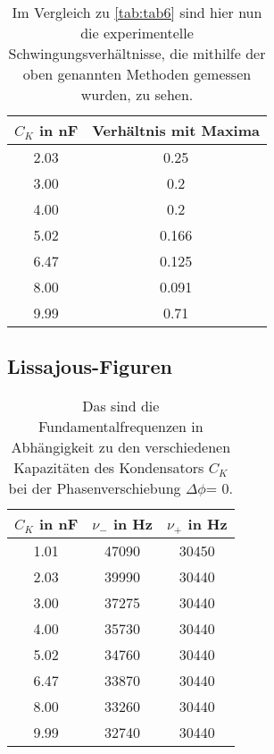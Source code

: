 \newpage

\begin{table}
  \centering
  \caption{Im Vergleich zu \autoref{tab:tab6} sind hier nun die  experimentelle Schwingungsverhältnisse, die mithilfe der oben genannten Methoden gemessen wurden, zu sehen.}
  \label{tab:tab7}
  \begin{tabular}{c c}
    \toprule
    \(C_K\) in nF & Verhältnis mit Maxima\\
    \midrule
    2.03 & 0.25 \\
    3.00 & 0.2 \\
    4.00 & 0.2 \\
    5.02 & 0.166 \\
    6.47 & 0.125 \\
    8.00 & 0.091 \\
    9.99 & 0.71 \\
    \bottomrule
  \end{tabular}
\end{table}

\newpage
\subsection{Lissajous-Figuren}

\begin{table}
  \centering
  \caption{Das sind die Fundamentalfrequenzen in Abhängigkeit zu den verschiedenen Kapazitäten des Kondensators \(C_K\) bei der Phasenverschiebung $\Delta\phi$= 0.}
  \label{tab:tab2}
  \begin{tabular}{c c c}
    \toprule
    \(C_K\) in nF & \(\nu_-\) in Hz & \(\nu_+\) in Hz\\
    \midrule
    1.01 & 47090 & 30450 \\
    2.03 & 39990 & 30440 \\
    3.00 & 37275 & 30440 \\
    4.00 & 35730 & 30440 \\
    5.02 & 34760 & 30440 \\
    6.47 & 33870 & 30440 \\
    8.00 & 33260 & 30440 \\
    9.99 & 32740 & 30440 \\
    \bottomrule
  \end{tabular}
\end{table}

